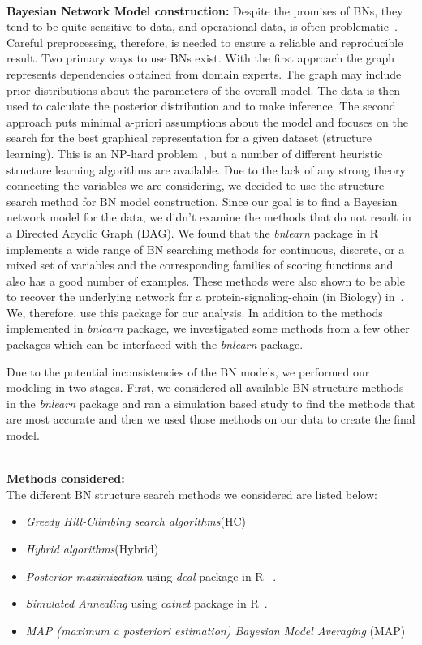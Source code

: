 \documentclass[smallextended]{svjour3}       %
\begin{document}
\noindent\\
\textbf{Bayesian Network Model construction:}
Despite the promises of BNs, they tend to be quite sensitive to data,
and operational data, is often problematic~\cite{M14,zmz15}. 
Careful preprocessing, therefore, is needed to ensure a 
reliable and reproducible result. Two primary ways to use BNs exist. With the first
approach the graph represents dependencies obtained from domain experts.
The graph may include prior distributions
about the parameters of the overall model. The data is then used to
calculate the posterior distribution and to make inference. The
second approach puts minimal a-priori assumptions about the model
and focuses on the search for the best graphical representation for a given dataset
(structure learning). This is an NP-hard problem~\cite{chickering1996learning},
but a number of different heuristic structure learning algorithms are
available. Due to the lack of any strong theory connecting the variables we are considering,
we decided to use the structure search method for BN model construction.
Since our goal is to find a Bayesian network model for the data, we didn't
examine the methods that do not result in a Directed Acyclic Graph
(DAG). We found that the \textit{bnlearn} package in R implements a wide range of BN searching
methods for continuous, discrete, or a mixed set of variables and
the corresponding families of scoring functions and also has a good number of examples.
These methods were also shown to be able to recover the underlying network for a 
protein-signaling-chain (in Biology) in~\cite{bnppt}. We, therefore,
use this package for our analysis. In addition to the methods
implemented in \textit{bnlearn} package, we investigated some 
methods from a few other packages which can be interfaced with
the \textit{bnlearn} package.

Due to the potential inconsistencies of the BN models, we performed our 
modeling in two stages. First, we considered all available BN structure 
methods in the \textit{bnlearn} package and ran a simulation based study to 
find the methods that are most accurate and then we used those methods on our 
data to create the final model.

\noindent\\
\textbf{Methods considered:}\\
The different BN structure search methods we considered are listed below:

\begin{itemize}
\item \textit{Greedy Hill-Climbing search algorithms}(HC)~\cite{nagarajan2013bayesian,bnppt}
\item \textit{Hybrid algorithms}(Hybrid)~\cite{nagarajan2013bayesian,bnppt}
\item \textit{Posterior maximization} using \textit{deal} package in R~\cite{bnppt,dealR} .
\item \textit{Simulated Annealing} using \textit{catnet} package in R~\cite{catnetR,bnppt}.
\item \textit{MAP (maximum a posteriori estimation) Bayesian Model Averaging} (MAP) ~\cite{nagarajan2013bayesian,bnppt}
\end{itemize}
\end{document}
